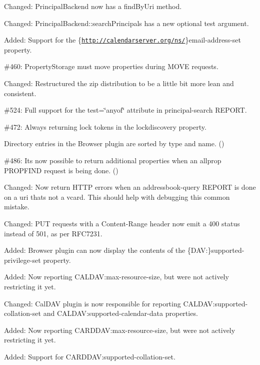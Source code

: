 \begin{DoxyItemize}
\item Changed\+: Principal\+Backend now has a find\+By\+Uri method.
\item Changed\+: {\ttfamily Principal\+Backend\+::search\+Principals} has a new optional {\ttfamily test} argument.
\item Added\+: Support for the {\ttfamily \{\href{http://calendarserver.org/ns/}{\tt http\+://calendarserver.\+org/ns/}\}email-\/address-\/set} property.
\item \#460\+: Property\+Storage must move properties during {\ttfamily M\+O\+VE} requests.
\item Changed\+: Restructured the zip distribution to be a little bit more lean and consistent.
\item \#524\+: Full support for the {\ttfamily test=\char`\"{}anyof\char`\"{}} attribute in principal-\/search {\ttfamily R\+E\+P\+O\+RT}.
\item \#472\+: Always returning lock tokens in the lockdiscovery property.
\item Directory entries in the Browser plugin are sorted by type and name. ()
\item \#486\+: It\textquotesingle{}s now possible to return additional properties when an \textquotesingle{}allprop\textquotesingle{} P\+R\+O\+P\+F\+I\+ND request is being done. ()
\item Changed\+: Now return H\+T\+TP errors when an addressbook-\/query R\+E\+P\+O\+RT is done on a uri that\textquotesingle{}s not a vcard. This should help with debugging this common mistake.
\item Changed\+: {\ttfamily P\+UT} requests with a {\ttfamily Content-\/\+Range} header now emit a 400 status instead of 501, as per R\+F\+C7231.
\item Added\+: Browser plugin can now display the contents of the {\ttfamily \{D\+AV\+:\}supported-\/privilege-\/set} property.
\item Added\+: Now reporting {\ttfamily C\+A\+L\+D\+AV\+:max-\/resource-\/size}, but we\textquotesingle{}re not actively restricting it yet.
\item Changed\+: Cal\+D\+AV plugin is now responsible for reporting {\ttfamily C\+A\+L\+D\+AV\+:supported-\/collation-\/set} and {\ttfamily C\+A\+L\+D\+AV\+:supported-\/calendar-\/data} properties.
\item Added\+: Now reporting {\ttfamily C\+A\+R\+D\+D\+AV\+:max-\/resource-\/size}, but we\textquotesingle{}re not actively restricting it yet.
\item Added\+: Support for {\ttfamily C\+A\+R\+D\+D\+AV\+:supported-\/collation-\/set}.

\end{DoxyItemize}
